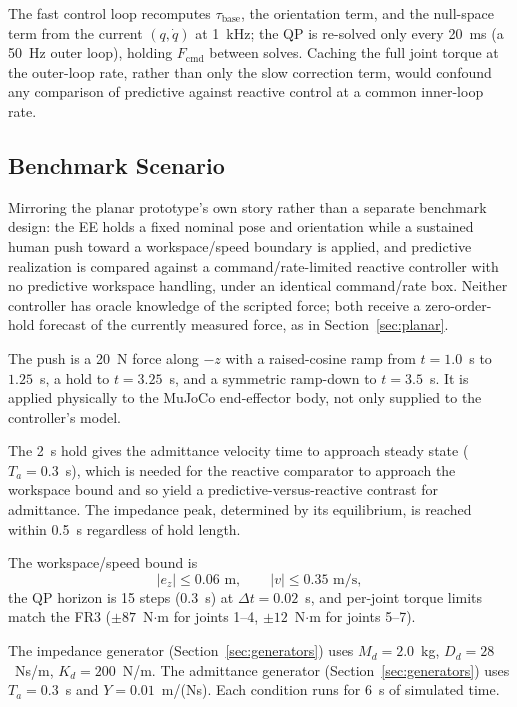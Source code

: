 \documentclass[journal]{IEEEtran}
\begin{document}
The fast control loop recomputes $\tau_{\mathrm{base}}$, the orientation
term, and the null-space term from the current $(q,\dot q)$ at 1~kHz;
the QP is re-solved only every 20~ms (a 50~Hz outer loop), holding
$F_{\mathrm{cmd}}$ between solves. Caching the full joint torque at the
outer-loop rate, rather than only the slow correction term, would
confound any comparison of predictive against reactive control at a
common inner-loop rate.

\subsection{Benchmark Scenario}

Mirroring the planar prototype's own story rather than a separate
benchmark design: the EE holds a fixed nominal pose and orientation
while a sustained human push toward a workspace/speed boundary is
applied, and predictive realization is compared against a command/rate-limited
reactive controller with no predictive workspace handling, under an identical
command/rate box. Neither controller has
oracle knowledge of the scripted force; both receive a zero-order-hold
forecast of the currently measured force, as in Section~\ref{sec:planar}.

The push is a 20~N force along $-z$ with a raised-cosine ramp from
$t=1.0$~s to $1.25$~s, a hold to $t=3.25$~s, and a symmetric ramp-down to
$t=3.5$~s. It is applied physically to the MuJoCo end-effector body, not
only supplied to the controller's model.

The 2~s hold gives the admittance velocity time to approach steady state
($T_a=0.3$~s), which is needed for the reactive comparator to approach
the workspace bound and so yield a predictive-versus-reactive contrast
for admittance. The impedance peak, determined by its equilibrium, is
reached within 0.5~s regardless of hold length.

The workspace/speed bound is
\begin{equation}
|e_z|\le0.06\text{ m},\qquad |v|\le0.35\text{ m/s},
\end{equation}
the QP horizon is 15 steps (0.3~s) at $\Delta t=0.02$~s, and per-joint
torque limits match the FR3 ($\pm87$~N$\cdot$m for joints 1--4,
$\pm12$~N$\cdot$m for joints 5--7).

The impedance generator (Section~\ref{sec:generators}) uses $M_d=2.0$~kg,
$D_d=28$~Ns/m, $K_d=200$~N/m. The admittance generator
(Section~\ref{sec:generators}) uses $T_a=0.3$~s and $Y=0.01$~m/(Ns).
Each condition runs for 6~s of simulated time.
\end{document}
